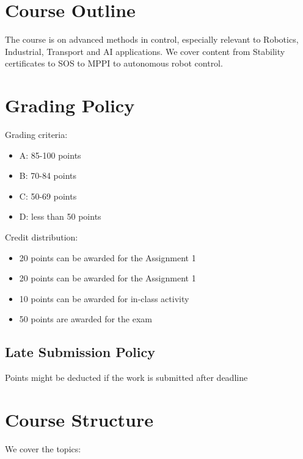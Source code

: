 \documentclass[11pt,a4paper]{article}
\begin{document}
%

\section{Course Outline}
The course is on advanced methods in control, especially relevant to Robotics, Industrial, Transport and AI applications. We cover content from Stability certificates to SOS to MPPI to autonomous robot control.

\section{Grading Policy}
Grading criteria:
\begin{itemize}
	\item A: 85-100 points
	\item B: 70-84 points
	\item C: 50-69 points
	\item D: less than 50 points
\end{itemize}

Credit distribution:
\begin{itemize}
	\item 20 points can be awarded for the Assignment 1
	\item 20 points can be awarded for the Assignment 1
	\item 10 points can be awarded for in-class activity
	\item 50 points are awarded for the exam
\end{itemize}

\subsection{Late Submission Policy}
Points might be deducted if the work is submitted after deadline


\section{Course Structure}

We cover the topics:
\end{document}

